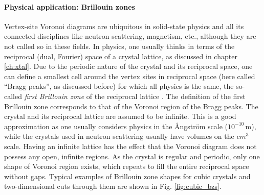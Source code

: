 \paragraph{Physical application: Brillouin zones}
Vertex-site Voronoi diagrams are ubiquitous in solid-state physics and all its connected disciplines
like neutron scattering, magnetism, etc., although they are not called so in these fields.
In physics, one usually thinks in terms of the reciprocal (dual, Fourier) space of a crystal lattice, as discussed
in chapter \ref{ch:xtal}. Due to the periodic nature of the crystal and its reciprocal space, one can define a smallest
cell around the vertex sites in reciprocal space (here called ``Bragg peaks'', as discussed before) for which all physics is 
the same, the so-called \textit{first Brillouin zone} of the reciprocal lattice \cite[pp. 63-64]{Gross2012}. 
The definition of the first Brillouin zone corresponds to that of the Voronoi region of the Bragg peaks.
The crystal and its reciprocal lattice are assumed to be infinite. This is a good approximation as one usually
considers physics in the \AA{}ngstr\"om scale ($10^{-10}\,\mathrm{m}$), while the crystals used in neutron scattering usually have volumes on the
$cm^3$ scale. Having an infinite lattice has the effect that the Voronoi diagram does not possess any open, infinite regions.
As the crystal is regular and periodic, only one shape of Voronoi region exists, which repeats to fill the
entire reciprocal space without gaps.
Typical examples of Brillouin zone shapes for cubic crystals and two-dimensional cuts through them 
are shown in Fig. \ref{fig:cubic_bzs}.

